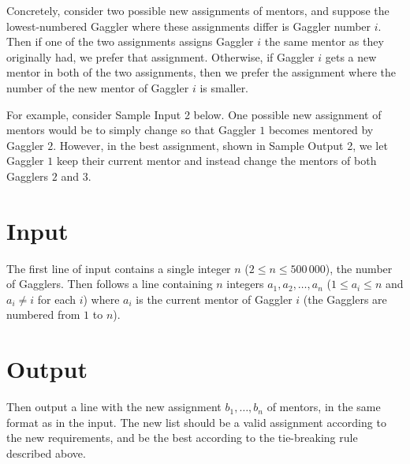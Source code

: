 Concretely, consider two possible new assignments of mentors, and
suppose the lowest-numbered Gaggler where these assignments differ is
Gaggler number $i$.  Then if one of the two assignments assigns
Gaggler $i$ the same mentor as they originally had, we prefer that
assignment.  Otherwise, if Gaggler $i$ gets a new mentor in both of
the two assignments, then we prefer the assignment where the number of
the new mentor of Gaggler $i$ is smaller.

For example, consider Sample Input 2 below.  One possible new
assignment of mentors would be to simply change so that Gaggler $1$
becomes mentored by Gaggler $2$.  However, in the best assignment,
shown in Sample Output 2, we let Gaggler $1$ keep their current mentor
and instead change the mentors of both Gagglers $2$ and $3$.

\section*{Input}

The first line of input contains a single integer $n$ ($2 \le n \le
500\,000$), the number of Gagglers.  Then follows a line containing
$n$ integers $a_1, a_2, \ldots, a_n$ ($1 \le a_i \le n$ and $a_i \ne
i$ for each $i$) where $a_i$ is the current mentor of Gaggler $i$ (the
Gagglers are numbered from $1$ to $n$).

\section*{Output}

Then output a line with the new assignment $b_1, \ldots, b_n$ of
mentors, in the same format as in the input.  The new list should be a
valid assignment according to the new requirements, and be the best
according to the tie-breaking rule described above.
